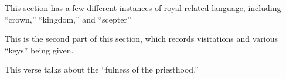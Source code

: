 \begin{compactdesc}
			\item[{\hyperref[DC94-6]{DC 94:6}}]
			\item[{\hyperref[DC98-3]{DC 98:3}}]
			\item[{\hyperref[DC98-14]{DC 98:14--15}}]
			\item[{\hyperref[DC101-77]{DC 101:77--78}}]
			\item[{\hyperref[DC106]{DC 106}}] \phantom{.}
				\begin{compactitem}
					\item This section has a few different instances of royal-related language, including ``crown,'' ``kingdom,'' and ``scepter''
				\end{compactitem}
			\item[{\hyperref[DC107-1]{DC 107:1--20}}]
			\item[{\hyperref[DC107-40]{DC 107:40--57}}]
			\item[{\hyperref[DC110-11]{DC 110:11--16}}] \phantom{.}
				\begin{compactitem}
					\item This is the second part of this section, which records visitations and various ``keys'' being given.
				\end{compactitem}
			\item[{\hyperref[DC112-28]{DC 112:28--33}}]
			\item[{\hyperref[DC113-6]{DC 113:6}}]
			\item[{\hyperref[DC113-8]{DC 113:8}}]
			\item[{\hyperref[DC115-19]{DC 115:19}}]
			\item[{\hyperref[DC121-4]{DC 121:4}}]
			\item[{\hyperref[DC121-21]{DC 121:21}}]
			\item[{\hyperref[DC121-29]{DC 121:29--32}}]
			\item[{\hyperref[DC121-34]{DC 121:34--46}}]
			\item[{\hyperref[DC124-19]{DC 124:19}}]
			\item[{\hyperref[DC124-28]{DC 124:28}}]
				\begin{compactitem}
					\item This verse talks about the ``fulness of the priesthood.''
				\end{compactitem}
			\item[{\hyperref[DC124-33]{DC 124:33--34}}]
			\item[{\hyperref[DC124-42]{DC 124:42}}]
			\item[{\hyperref[DC124-55]{DC 124:55}}]
			\item[{\hyperref[DC124-91]{DC 124:91--97}}] \phantom{.}

\end{compactdesc}
